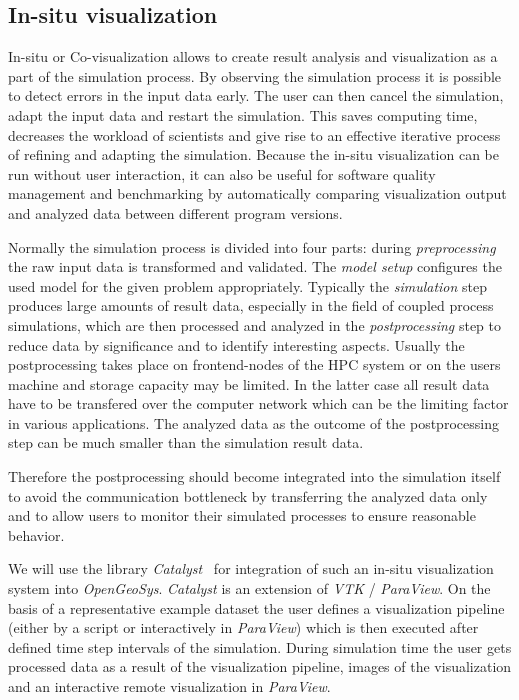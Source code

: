 \documentclass[twocolumn]{svjour3}          %
\begin{document}
\subsection{In-situ visualization}
\label{in-situ-visualization}

In-situ or Co-visualization allows to create result analysis and visualization as a part of the simulation process. By observing the simulation process it is possible to detect errors in the input data early. The user can then cancel the simulation, adapt the input data and restart the simulation. This saves computing time, decreases the workload of scientists and give rise to an effective iterative process of refining and adapting the simulation. Because the in-situ visualization can be run without user interaction, it can also be useful for software quality management and benchmarking by automatically comparing visualization output and analyzed data between different program versions.

Normally the simulation process is divided into four parts: during \emph{preprocessing} the raw input data is transformed and validated. The \emph{model setup} configures the used model for the given problem appropriately. Typically the \emph{simulation} step produces large amounts of result data, especially in the field of coupled process simulations, which are then processed and analyzed in the \emph{postprocessing} step to reduce data by significance and to identify interesting aspects. Usually the postprocessing takes place on frontend-nodes of the HPC system or on the users machine and storage capacity may be limited. In the latter case all result data have to be transfered over the computer network which can be the limiting factor in various applications. The analyzed data as the outcome of the postprocessing step can be much smaller than the simulation result data.

Therefore the postprocessing should become integrated into the simulation itself to avoid the communication bottleneck by transferring the analyzed data only and to allow users to monitor their simulated processes to ensure reasonable behavior.

We will use the library \emph{Catalyst}~\cite{web:catalyst} for integration of such an in-situ visualization system into \emph{OpenGeoSys}. \emph{Catalyst} is an extension of \emph{VTK} / \emph{ParaView}. On the basis of a representative example dataset the user defines a visualization pipeline (either by a script or interactively in \emph{ParaView}) which is then executed after defined time step intervals of the simulation. During simulation time the user gets processed data as a result of the visualization pipeline, images of the visualization and an interactive remote visualization in \emph{ParaView}.
\end{document}
